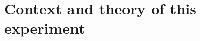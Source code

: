 \documentclass[a4paper,10pt]{article}
\begin{document}
\section*{Context and theory of this experiment}
\end{document}
